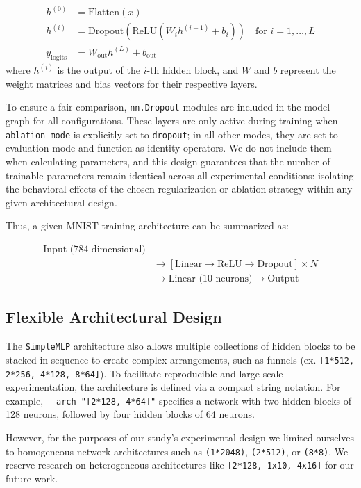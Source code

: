 \documentclass[conference]{IEEEtran}
\begin{document}
\begin{align}
h^{(0)} &= \text{Flatten}(x) \\
h^{(i)} &= \text{Dropout}(\text{ReLU}(W_i h^{(i-1)} + b_i)) \quad \text{for } i=1, \dots, L \\
y_{\text{logits}} &= W_{\text{out}} h^{(L)} + b_{\text{out}}
\end{align}
where $h^{(i)}$ is the output of the $i$-th hidden block, and $W$ and $b$ represent the weight matrices and bias vectors for their respective layers.

To ensure a fair comparison, \verb|nn.Dropout| modules are included in the model graph for all configurations. These layers are only active during training when \verb|--ablation-mode| is explicitly set to \verb|dropout|; in all other modes, they are set to evaluation mode and function as identity operators. We do not include them when calculating parameters, and this design guarantees that the number of trainable parameters remain identical across all experimental conditions: isolating the behavioral effects of the chosen regularization or ablation strategy within any given architectural design.

Thus, a given MNIST training architecture can be summarized as:

\begin{align*}
\text{Input (784-dimensional)}\\
&\rightarrow [\text{Linear} \rightarrow \text{ReLU} \rightarrow \text{Dropout}] \times N \\
&\rightarrow \text{Linear (10 neurons)} \rightarrow \text{Output}
\end{align*}

\subsection{Flexible Architectural Design}

The \verb|SimpleMLP| architecture also allows multiple collections of hidden blocks to be stacked in sequence to create complex arrangements, such as funnels (ex. \verb|[1*512, 2*256, 4*128, 8*64]|). To facilitate reproducible and large-scale experimentation, the architecture is defined via a compact string notation. For example, \verb|--arch "[2*128, 4*64]"| specifies a network with two hidden blocks of 128 neurons, followed by four hidden blocks of 64 neurons.

However, for the purposes of our study's experimental design we limited ourselves to homogeneous network architectures such as \verb|(1*2048)|, \verb|(2*512)|, or \verb|(8*8)|. We reserve research on heterogeneous architectures like \verb|[2*128, 1x10, 4x16]| for our future work.
\end{document}

